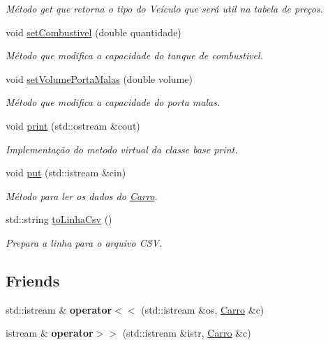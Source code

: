 \begin{DoxyCompactItemize}
\begin{DoxyCompactList}\small\item\em Método get que retorna o tipo do Veículo que será util na tabela de preços. \end{DoxyCompactList}\item 
void \hyperlink{classCarro_a826a4c03c3bf115d0b71bd5504c32a24}{set\+Combustivel} (double quantidade)
\begin{DoxyCompactList}\small\item\em Método que modifica a capacidade do tanque de combustivel. \end{DoxyCompactList}\item 
void \hyperlink{classCarro_ae4624938c5f8f48fc313b3a0a3b6fa48}{set\+Volume\+Porta\+Malas} (double volume)
\begin{DoxyCompactList}\small\item\em Método que modifica a capacidade do porta malas. \end{DoxyCompactList}\item 
void \hyperlink{classCarro_ae358f01446ebc1cf966e233cc26ae5e2}{print} (std\+::ostream \&cout)
\begin{DoxyCompactList}\small\item\em Implementação do metodo virtual da classe base \textquotesingle{}print\textquotesingle{}. \end{DoxyCompactList}\item 
void \hyperlink{classCarro_a78d2b6f206ba9e33b5df2f4722434bc3}{put} (std\+::istream \&cin)
\begin{DoxyCompactList}\small\item\em Método para ler os dados do \hyperlink{classCarro}{Carro}. \end{DoxyCompactList}\item 
std\+::string \hyperlink{classCarro_ab41a71fde77e7c2c7a1d6f7fa9899970}{to\+Linha\+Csv} ()
\begin{DoxyCompactList}\small\item\em Prepara a linha para o arquivo C\+SV. \end{DoxyCompactList}\end{DoxyCompactItemize}
\subsection*{Friends}
\begin{DoxyCompactItemize}
\item 
\mbox{\label{classCarro_a7a3158300c210309a0e2019ba0b67ec8}} 
std\+::istream \& {\bfseries operator$<$$<$} (std\+::istream \&os, \hyperlink{classCarro}{Carro} \&c)
\item 
\mbox{\label{classCarro_a1fb1c0527d5cc52193fc304bc1646864}} 
istream \& {\bfseries operator$>$$>$} (std\+::istream \&istr, \hyperlink{classCarro}{Carro} \&c)
\end{DoxyCompactItemize}

